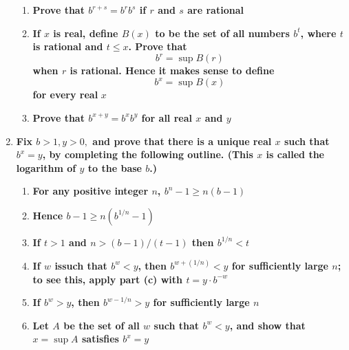 \documentclass[Main.tex]{subfiles}
\begin{document}
\begin{enumerate}
\begin{enumerate}
            
        
        \item \textbf{Prove that $b^{r+s}=b^rb^s$ if $r$ and $s$ are rational}
        
            
        
        \item \textbf{If $x$ is real, define $B(x)$ to be the set of all numbers $b^t$, where $t$ is rational and $t\leq x$. Prove that}
        $$b^r=\sup B(r)$$
        \textbf{when $r$ is rational. Hence it makes sense to define}
        $$b^x=\sup B(x)$$
        \textbf{for every real} $x$
        
            
        
        \item \textbf{Prove that $b^{x+y}=b^xb^y$ for all real $x$ and $y$}
        
            
        
    \end{enumerate}
    
    \item \textbf{Fix $b>1,y>0,$ and prove that there is a unique real $x$ such that $b^x=y$, by completing the following outline. (This $x$ is called the logarithm of $y$ to the base $b$.)}
    \begin{enumerate}
        \item \textbf{For any positive integer $n$, $b^n-1\geq n(b-1)$}
        
            
        
        \item \textbf{Hence $b-1\geq n(b^{1/n}-1)$}
        
            
        
        \item \textbf{If $t>1$ and $n>(b-1)/(t-1)$ then $b^{1/n}<t$}
        
            
        
        \item \textbf{If $w$ issuch that $b^w<y$, then $b^{w+(1/n)}<y$ for sufficiently large $n$; to see this, apply part (c) with $t=y\cdot b^{-w}$}
        
            
        
        \item \textbf{If $b^w>y$, then $b^{w-1/n}>y$ for sufficiently large $n$}
        
            
        
        \item \textbf{Let $A$ be the set of all $w$ such that $b^w<y$, and show that $x=\sup A$ satisfies $b^x=y$}
        

\end{enumerate}
\end{enumerate}
\end{document}
